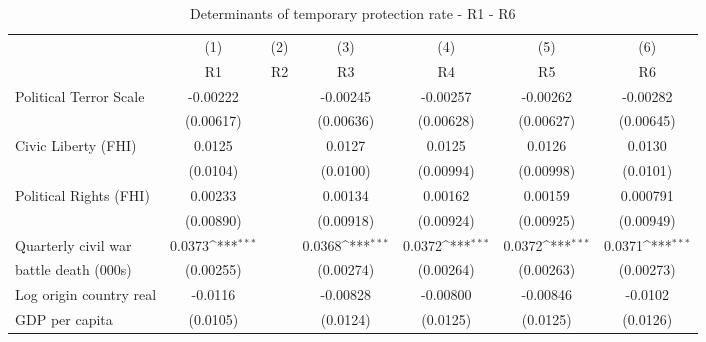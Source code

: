 \begin{table}[!ht]\centering \scriptsize
	\def\sym#1{\ifmmode^{#1}\else\(^{#1}\)\fi}
	\caption{Determinants of temporary protection rate - R1 - R6}
	\begin{tabular}{l*{6}{c}}
		\hline\hline
		&\multicolumn{1}{c}{(1)}     &\multicolumn{1}{c}{(2)}       &\multicolumn{1}{c}{(3)}       &\multicolumn{1}{c}{(4)}    	&\multicolumn{1}{c}{(5)}  	&\multicolumn{1}{c}{(6)}   \\
		&\multicolumn{1}{c}{R1}&\multicolumn{1}{c}{R2}&\multicolumn{1}{c}{R3}&\multicolumn{1}{c}{R4}&\multicolumn{1}{c}{R5}&\multicolumn{1}{c}{R6}\\
\hline
Political Terror Scale&    -0.00222         &                     &    -0.00245         &    -0.00257         &    -0.00262         &    -0.00282         \\
                    &   (0.00617)         &                     &   (0.00636)         &   (0.00628)         &   (0.00627)         &   (0.00645)         \\
[0.5em]
Civic Liberty (FHI) &      0.0125         &                     &      0.0127         &      0.0125         &      0.0126         &      0.0130         \\
                    &    (0.0104)         &                     &    (0.0100)         &   (0.00994)         &   (0.00998)         &    (0.0101)         \\
[0.5em]
Political Rights (FHI)&     0.00233         &                     &     0.00134         &     0.00162         &     0.00159         &    0.000791         \\
                    &   (0.00890)         &                     &   (0.00918)         &   (0.00924)         &   (0.00925)         &   (0.00949)         \\
[0.5em]
Quarterly civil war &      0.0373\sym{***}&                     &      0.0368\sym{***}&      0.0372\sym{***}&      0.0372\sym{***}&      0.0371\sym{***}\\
battle death (000s)                    &   (0.00255)         &                     &   (0.00274)         &   (0.00264)         &   (0.00263)         &   (0.00273)         \\
[0.5em]
Log origin country real&     -0.0116         &                     &    -0.00828         &    -0.00800         &    -0.00846         &     -0.0102         \\
 GDP per capita                    &    (0.0105)         &                     &    (0.0124)         &    (0.0125)         &    (0.0125)         &    (0.0126)         \\

\end{tabular}
\end{table}

